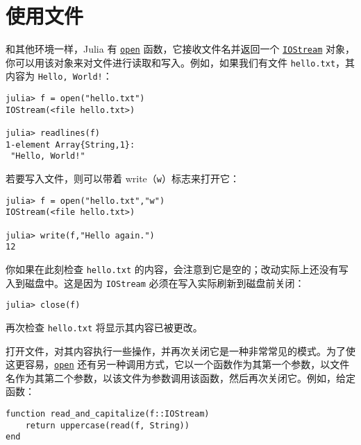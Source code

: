 \hypertarget{17626527008259433393}{}


\section{使用文件}



和其他环境一样，Julia 有 \hyperlink{300818094931158296}{\texttt{open}} 函数，它接收文件名并返回一个 \hyperlink{12496894737220238417}{\texttt{IOStream}} 对象，你可以用该对象来对文件进行读取和写入。例如，如果我们有文件 \texttt{hello.txt}，其内容为 \texttt{Hello, World!}：




\begin{verbatim}
julia> f = open("hello.txt")
IOStream(<file hello.txt>)

julia> readlines(f)
1-element Array{String,1}:
 "Hello, World!"
\end{verbatim}



若要写入文件，则可以带着 write（\texttt{{\textquotedbl}w{\textquotedbl}}）标志来打开它：




\begin{verbatim}
julia> f = open("hello.txt","w")
IOStream(<file hello.txt>)

julia> write(f,"Hello again.")
12
\end{verbatim}



你如果在此刻检查 \texttt{hello.txt} 的内容，会注意到它是空的；改动实际上还没有写入到磁盘中。这是因为 \texttt{IOStream} 必须在写入实际刷新到磁盘前关闭：




\begin{verbatim}
julia> close(f)
\end{verbatim}



再次检查 \texttt{hello.txt} 将显示其内容已被更改。



打开文件，对其内容执行一些操作，并再次关闭它是一种非常常见的模式。为了使这更容易，\hyperlink{300818094931158296}{\texttt{open}} 还有另一种调用方式，它以一个函数作为其第一个参数，以文件名作为其第二个参数，以该文件为参数调用该函数，然后再次关闭它。例如，给定函数：




\begin{verbatim}
function read_and_capitalize(f::IOStream)
    return uppercase(read(f, String))
end
\end{verbatim}




